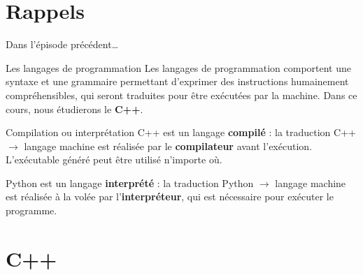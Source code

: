 
\subtitle{Variables, structures conditionnelles, boucles et fonctions}
\date{21 septembre 2018}
\maketitle

\section{Rappels}
\begin{frame}{Dans l'épisode précédent\dots}

\begin{block}{Les langages de programmation}
Les langages de programmation comportent une syntaxe et une grammaire permettant d'exprimer des instructions humainement compréhensibles, qui seront traduites pour être exécutées par la machine. Dans ce cours, nous étudierons le \textbf{C++}.
\end{block}

\begin{exampleblock}{Compilation ou interprétation}
C++ est un langage \textbf{compilé} : la traduction C++ $\rightarrow$ langage machine est réalisée par le \textbf{compilateur} avant l'exécution. L'exécutable généré peut être utilisé n'importe où.

Python est un langage \textbf{interprété} : la traduction Python $\rightarrow$ langage machine est réalisée à la volée par l'\textbf{interpréteur}, qui est nécessaire pour exécuter le programme.
\end{exampleblock}

\end{frame}

\section{C++}

